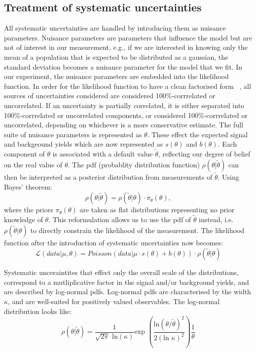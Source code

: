 \subsection{Treatment of systematic uncertainties}
\label{sys_treat}
All systematic uncertainties are handled by introducing them as nuisance parameters. Nuisance parameters are parameters that influence the model but are not of interest in our measurement, e.g., if we are interested in knowing only the mean of a population that is expected to be distributed as a gaussian, the standard deviation becomes a nuisance parameter for the model that we fit. In our experiment, the nuisance parameters are embedded into the likelihood function. In order for the likelihood function to have a clean factorised form ~\cite{note2011}, all sources of uncertainties considered are considered 100\%-corrrelated or uncorrelated. If an uncertainty is partially correlated, it is either separated into 100\%-corrrelated or uncorrelated components, or considered 100\%-corrrelated or uncorrelated, depending on whichever is a more conservative estimate. The full suite of nuisance parameters is represented as $\theta$. These effect the expected signal and backgeound yields which are now represented as $s(\theta)$ and $b(\theta)$. Each component of $\theta$ is associated with a default value $\tilde{\theta}$, reflecting our degree of belief on the real value of $\theta$. The pdf (probablity distribution function) $\rho(\theta|\tilde{\theta})$ can then be interpreted as a posterior distribution from measurements of $\tilde{\theta}$. Using Bayes' theorem:
\begin{equation}
  \rho(\theta|\tilde{\theta})=\rho(\tilde{\theta}|\theta)\cdot\pi_\theta(\theta),
\end{equation}
where the priors $\pi_\theta(\theta)$ are taken as flat distributions representing no prior knowledge of $\theta$. This reformulation allows us to use the pdf of $\tilde{\theta}$ instead, i.e. $\rho(\tilde{\theta}|\theta)$  to directly constrain the likelihood of the measurement. The likelihood function after the introduction of systematic uncertainties now becomes:
\begin{equation}
  \mathcal{L}(data|\mu,\theta)=Poisson(data|\mu\cdot s(\theta) + b(\theta))\cdot\rho(\tilde{\theta}|\theta)
\end{equation}

Systematic unceraintites that effect only the overall scale of the distributions, correspond to a mutliplicative factor in the signal and/or background yields, and are described by log-normal pdfs. Log-normal pdfs are characterised by the width $\kappa$, and are well-suited for positively valued observables. The log-normal distribution looks like:
\begin{equation}
\rho(\theta|\tilde{\theta})=\frac{1}{\sqrt{2\pi}\text{ ln}(\kappa)}\text{exp }(\frac{\text{ln}(\theta/\tilde{\theta})^2}{2(\text{ln }\kappa)^2}) \frac{1}{\theta}  
\end{equation}

